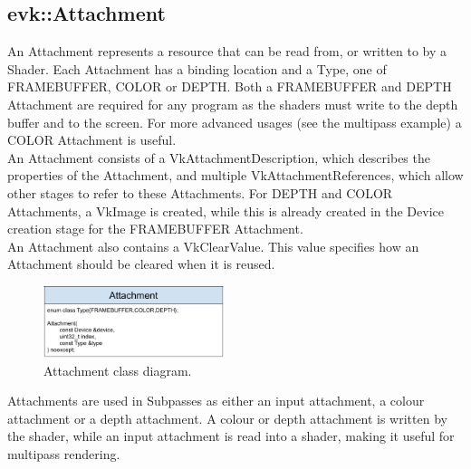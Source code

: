 \documentclass[12pt]{report}
\newcommand{\figurewidth}{0.55\textwidth}
\newcommand{\imagewidth}{0.47\textwidth}
\theoremstyle{definition}
\begin{document}
      \subsection{evk::Attachment}

        An Attachment represents a resource that can be read from, or written
        to by a Shader. Each Attachment has a binding location and a Type, one
        of FRAMEBUFFER, COLOR or DEPTH. Both a FRAMEBUFFER and DEPTH Attachment
        are required for any program as the shaders must write to the depth
        buffer and to the screen. For more advanced usages (see the multipass
        example) a COLOR Attachment is useful. \\

        An Attachment consists of a VkAttachmentDescription, which describes
        the properties of the Attachment, and multiple VkAttachmentReferences,
        which allow other stages to refer to these Attachments. For DEPTH and
        COLOR Attachments, a VkImage is created, while this is already created
        in the Device creation stage for the FRAMEBUFFER Attachment. \\

        An Attachment also contains a VkClearValue. This value specifies how an
        Attachment should be cleared when it is reused. \\

        \begin{figure}
          \centering
          \includegraphics[width=\imagewidth]{images/class_attachment.png}
          \caption{Attachment class diagram.}
          \label{fig:class_attachment}  
        \end{figure}

        Attachments are used in Subpasses as either an input attachment, a
        colour attachment or a depth attachment. A colour or depth attachment
        is written by the shader, while an input attachment is read into a
        shader, making it useful for multipass rendering.
\end{document}
